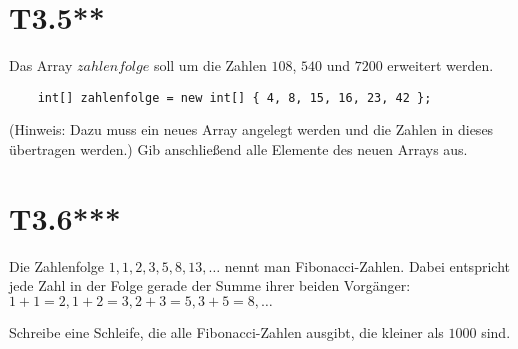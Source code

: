 \documentclass[final,a4paper]{article}
\begin{document}
\section*{T3.5**}
	Das Array $zahlenfolge$ soll um die Zahlen $108$, $540$ und $7200$ erweitert werden.
	\begin{lstlisting}
	int[] zahlenfolge = new int[] { 4, 8, 15, 16, 23, 42 };
	\end{lstlisting}
	(Hinweis: Dazu muss ein neues Array angelegt werden und die Zahlen in dieses übertragen werden.)
	Gib anschließend alle Elemente des neuen Arrays aus.

\section*{T3.6***}
	Die Zahlenfolge $1, 1, 2, 3, 5, 8, 13, \ldots$ nennt man Fibonacci-Zahlen. Dabei entspricht jede Zahl
	in der Folge gerade der Summe ihrer beiden Vorgänger: $1+1=2, 1+2=3, 2+3=5, 3+5=8, \ldots$

	Schreibe eine Schleife, die alle Fibonacci-Zahlen ausgibt, die kleiner als $1000$ sind.
\end{document}
